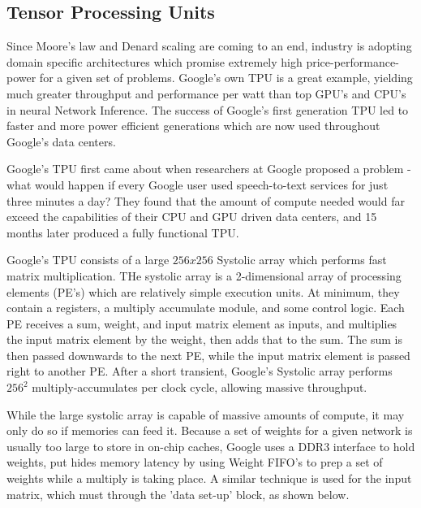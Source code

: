 \documentclass[11pt, conference, onecolumn]{IEEEtran}
\begin{document}
\subsection{Tensor Processing Units}
    Since Moore's law and Denard scaling are coming to an end, industry is adopting
    domain specific architectures which promise extremely high price-performance-power for
    a given set of problems. Google's own TPU is a great example, yielding much greater
    throughput and performance per watt than top GPU's and CPU's in neural Network
    Inference. The success of Google's first generation TPU led to faster and more power
    efficient generations which are now used throughout Google's data centers.

    Google's TPU first came about when researchers at Google proposed a problem - what
    would happen if every Google user used speech-to-text services for just three minutes
    a day? They found that the amount of compute needed would far exceed the capabilities
    of their CPU and GPU driven data centers, and 15 months later produced a fully
    functional TPU.

    Google's TPU consists of a large $256 x 256$ Systolic array which performs fast matrix
    multiplication. THe systolic array is a 2-dimensional array of processing elements
    (PE's) which are relatively simple execution units. At minimum, they contain a
    registers, a multiply accumulate module, and some control logic. Each PE receives a
    sum, weight, and input matrix element as inputs, and multiplies the input matrix
    element by the weight, then adds that to the sum. The sum is then passed downwards
    to the next PE, while the input matrix element is passed right to another PE. After
    a short transient, Google's Systolic array performs $256^2$ multiply-accumulates per
    clock cycle, allowing massive throughput.

    While the large systolic array is capable of massive amounts of compute, it may only
    do so if memories can feed it. Because a set of weights for a given network is usually
    too large to store in on-chip caches, Google uses a DDR3 interface to hold weights,
    put hides memory latency by using Weight FIFO's to prep a set of weights while a
    multiply is taking place. A similar technique is used for the input matrix, which must
    through the 'data set-up' block, as shown below.
\end{document}

